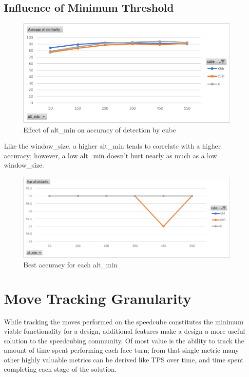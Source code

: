 \subsection{Influence of Minimum Threshold}

\begin{figure}[h]
    \centering
    \caption{Effect of alt\_min on accuracy of detection by cube}
    \label{fig:similarity-by-alt-min}
    \includegraphics[width=0.75\linewidth]{Figures/7 Evaluation/similarity_by_alt_min.png}
\end{figure}

Like the window\_size, a higher alt\_min tends to correlate with a
higher accuracy; however, a low alt\_min doesn't hurt nearly as much as
a low window\_size.

\begin{figure}[h]
    \centering
    \caption{Best accuracy for each alt\_min}
    \label{fig:max-similarity-by-alt-min}
    \includegraphics[width=0.75\linewidth]{Figures/7 Evaluation/max_similarity_by_alt_min.png}
\end{figure}


\section{Move Tracking Granularity}
\label{sec:move-tracking-granularity}

While tracking the moves performed on the speedcube constitutes the
minimum viable functionality for a design, additional features make a
design a more useful solution to the speedcubing community. Of most
value is the ability to track the amount of time spent performing each
face turn; from that single metric many other highly valuable metrics
can be derived like TPS over time, and time spent completing each stage
of the solution.

